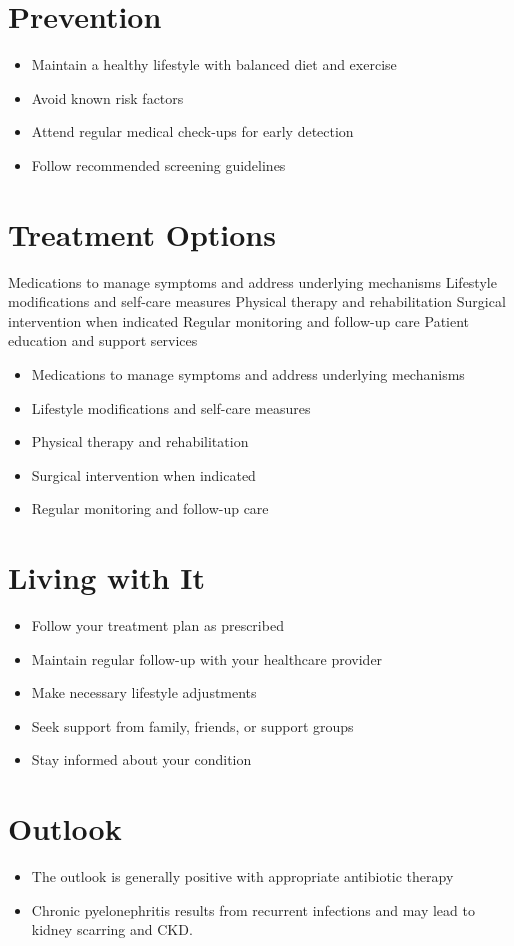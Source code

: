 \section{Prevention}
\begin{itemize}[noitemsep]
  \item Maintain a healthy lifestyle with balanced diet and exercise
  \item Avoid known risk factors
  \item Attend regular medical check-ups for early detection
  \item Follow recommended screening guidelines
\end{itemize}
\section{Treatment Options}
Medications to manage symptoms and address underlying mechanisms Lifestyle modifications and self-care measures Physical therapy and rehabilitation Surgical intervention when indicated Regular monitoring and follow-up care Patient education and support services

\begin{itemize}[noitemsep]
  \item Medications to manage symptoms and address underlying mechanisms
  \item Lifestyle modifications and self-care measures
  \item Physical therapy and rehabilitation
  \item Surgical intervention when indicated
  \item Regular monitoring and follow-up care
\end{itemize}
\section{Living with It}
\begin{itemize}[noitemsep]
  \item Follow your treatment plan as prescribed
  \item Maintain regular follow-up with your healthcare provider
  \item Make necessary lifestyle adjustments
  \item Seek support from family, friends, or support groups
  \item Stay informed about your condition
\end{itemize}
\section{Outlook}
\begin{itemize}[noitemsep]
  \item The outlook is generally positive with appropriate antibiotic therapy
  \item Chronic pyelonephritis results from recurrent infections and may lead to kidney scarring and CKD.
\end{itemize}
